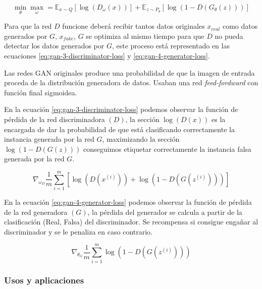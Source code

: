 \begin{equation}
    \min_{\theta}\max_{\omega} = \mathbb{E}_{x\sim{}Q} \left[\log\left(D_{\omega}(x)\right)\right] + \mathbb{E}_{z \sim{}P_{\theta}} \left[\log\left(1-D(G_{\theta}(z))\right)\right]
    \label{eq:gan-2}
\end{equation}

Para que la red ${D}$ funcione deberá recibir tantos datos originales ${x_{real}}$ como datos generados por ${G}$, ${x_{fake}}$, ${G}$ se optimiza al mismo tiempo para que ${D}$ no pueda detectar los datos generados por ${G}$, este proceso está representado en las ecuaciones \ref{eq:gan-3-discriminator-loss} y \ref{eq:gan-4-generator-loss}.

Las redes \gls{GAN} originales produce una probabilidad de que la imagen de entrada proceda de la distribución generadora de datos. Usaban una red \textit{feed-fordward} con función final sigmoidea.

En la ecuación \ref{eq:gan-3-discriminator-loss} podemos observar la función de pérdida de la red discriminadora ${(D)}$, la sección ${\log\left(D(x)\right)}$ es la encargada de dar la probabilidad de que está clasificando correctamente la instancia generada por la red ${G}$, maximizando la sección ${\log\left(1 - D(G(z))\right)}$ conseguimos etiquetar correctamente la instancia falsa generada por la red ${G}$.

\begin{equation}
    \nabla_{\omega_{D}} \frac{1}{m} \sum_{i=1}^{m} \left[ \log\left(D(x^{(i)})\right) + \log\left(1-D(G(z^{(i)}))\right) \right]
    \label{eq:gan-3-discriminator-loss}
\end{equation}

En la ecuación \ref{eq:gan-4-generator-loss} podemos observar la función de pérdida de la red generadora ${(G)}$, la pérdida del generador se calcula a partir de la clasificación (Real, Falsa) del discriminador. Se recompensa si consigue engañar al discriminador y se le penaliza en caso contrario.

\begin{equation}
    \nabla_{\theta_{G}} \frac{1}{m} \sum_{i=1}^{m} \log\left(1-D(G(z^{(i)}))\right)
    \label{eq:gan-4-generator-loss}
\end{equation}

\subsubsection{Usos y aplicaciones}

